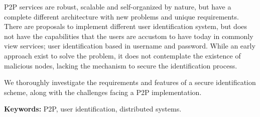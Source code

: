 

P2P services are robust, scalable and self-organized by nature, but have a
complete different architecture with new problems and unique requirements.
There are proposals to implement different user identification system, but does
not have the capabilities that the users are accustom to have today in commonly
view services; user identification based in username and password. While an
early approach exist to solve the problem, it does not contemplate the existence
of malicious nodes, lacking the mechanism to secure the identification
process.

 We thoroughly investigate the requirements and features of a secure
identification scheme, along with the challenges facing a P2P implementation.





{\bf Keywords:} P2P, user identification, distributed systems.
